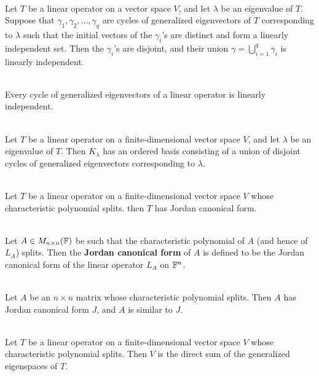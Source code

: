 \begin{theorem}
	\hfill\\
	Let $T$ be a linear operator on a vector space $V$, and let $\lambda$ be an eigenvalue of $T$. Suppose that $\gamma_1, \gamma_2, \dots,\gamma_q$ are cycles of generalized eigenvectors of $T$ corresponding to $\lambda$ such that the initial vectors of the $\gamma_i$'s are distinct and form a linearly independent set. Then the $\gamma_i$'s are disjoint, and their union $\gamma = \displaystyle\bigcup_{i = 1}^q \gamma_i$ is linearly independent.
\end{theorem}

\begin{corollary}
	\hfill\\
	Every cycle of generalized eigenvectors of a linear operator is linearly independent.
\end{corollary}

\begin{theorem}\label{Theorem 7.7}
	\hfill\\
	Let $T$ be a linear operator on a finite-dimensional vector space $V$, and let $\lambda$ be an eigenvalue of $T$. Then $K_\lambda$ has an ordered basis consisting of a union of disjoint cycles of generalized eigenvectors corresponding to $\lambda$.
\end{theorem}

\begin{corollary}
	\hfill\\
	Let $T$ be a linear operator on a finite-dimensional vector space $V$ whose characteristic polynomial splits. then $T$ has Jordan canonical form.
\end{corollary}

\begin{definition}
	\hfill\\
	Let $A \in M_{n \times n}(\mathbb{F})$ be such that the characteristic polynomial of $A$ (and hence of $L_A$) splits. Then the \textbf{Jordan canonical form} of $A$ is defined to be the Jordan canonical form of the linear operator $L_A$ on $\mathbb{F}^n$.
\end{definition}

\begin{corollary}
	\hfill\\
	Let $A$ be an $n \times n$ matrix whose characteristic polynomial splits. Then $A$ has Jordan canonical form $J$, and $A$ is similar to $J$.
\end{corollary}

\begin{theorem}
	\hfill\\
	Let $T$ be a linear operator on a finite-dimensional vector space $V$ whose characteristic polynomial splits. Then $V$ is the direct sum of the generalized eigenspaces of $T$.
\end{theorem}
